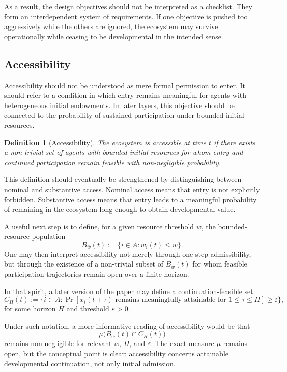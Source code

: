\documentclass[11pt]{article}
\newtheorem{definition}{Definition}
\begin{document}
As a result, the design objectives should not be interpreted as a checklist. They form an interdependent system of requirements. If one objective is pushed too aggressively while the others are ignored, the ecosystem may survive operationally while ceasing to be developmental in the intended sense.

\subsection{Accessibility}

Accessibility should not be understood as mere formal permission to enter. It should refer to a condition in which entry remains meaningful for agents with heterogeneous initial endowments. In later layers, this objective should be connected to the probability of sustained participation under bounded initial resources.

\begin{definition}[Accessibility]
The ecosystem is accessible at time \(t\) if there exists a non-trivial set of agents with bounded initial resources for whom entry and continued participation remain feasible with non-negligible probability.
\end{definition}

This definition should eventually be strengthened by distinguishing between nominal and substantive access. Nominal access means that entry is not explicitly forbidden. Substantive access means that entry leads to a meaningful probability of remaining in the ecosystem long enough to obtain developmental value.

A useful next step is to define, for a given resource threshold \(\bar{w}\), the bounded-resource population
\[
B_{\bar{w}}(t) := \{ i \in A : w_i(t) \leq \bar{w} \}.
\]
One may then interpret accessibility not merely through one-step admissibility, but through the existence of a non-trivial subset of \(B_{\bar{w}}(t)\) for whom feasible participation trajectories remain open over a finite horizon.

In that spirit, a later version of the paper may define a continuation-feasible set
\[
C_H(t) := \{ i \in A : \Pr[x_i(t+\tau) \text{ remains meaningfully attainable for } 1 \leq \tau \leq H] \geq \varepsilon \},
\]
for some horizon \(H\) and threshold \(\varepsilon > 0\).

Under such notation, a more informative reading of accessibility would be that
\[
\mu\big(B_{\bar{w}}(t) \cap C_H(t)\big)
\]
remains non-negligible for relevant \(\bar{w}\), \(H\), and \(\varepsilon\). The exact measure \(\mu\) remains open, but the conceptual point is clear: accessibility concerns attainable developmental continuation, not only initial admission.
\end{document}
